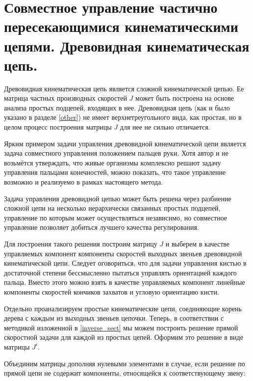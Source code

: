 \section{Совместное управление частично пересекающимися кинематическими цепями. Древовидная кинематическая цепь.}

Древовидная кинематическая цепь является сложной кинематической цепью. Ее матрица частных производных скоростей $J$ может быть построена на основе анализа простых подцепей, входящих в нее. Древовидная цепь (как и было указано в разделе \ref{other}) не имеет верхнетреугольного вида, как простая, но в целом процесс построения матрицы $J$ для нее не сильно отличается.

Ярким примером задачи управления древовидной кинематической цепи является задача совместного управления положением пальцев руки. Хотя автор и не возьмётся утверждать, что живые организмы комплексно решают задачу управления пальцами конечностей, можно показать, что такое управление возможно и реализуемо в рамках настоящего метода.

Задача управления древовидной цепью может быть решена через разбиение сложной цепи на несколько иерархически связанных простых подцепей, управление по которым может осуществляться независимо, но совместное управление позволяет добиться лучшего качества регулирования.

Для построения такого решения построим матрицу $J$ и выберем в качестве управляемых компонент компоненты скоростей выходных звеньев древовидной кинематической цепи. Следует оговориться, что для задачи управления кистью в достаточной степени бессмысленно пытаться управлять ориентацией каждого пальца. Вместо этого можно взять в качестве управляемых компонент линейные компоненты скоростей кончиков захватов и угловую ориентацию кисти. 

Отдельно проанализируем простые кинематические цепи, соединяющие корень дерева с каждым из выходных звеньев цепочки. Теперь, в соответствии с методикой изложенной в \ref{inverse_sect} мы можем построить решение прямой скоростной задачи для каждой из простых цепей. Оформим это решение в виде матрицы \textbf{$J^i$}.

Объединим матрицы дополняя нулевыми элементами в случае, если решение по прямой цепи не содержит компоненты, относящейся к соответствующему звену:

